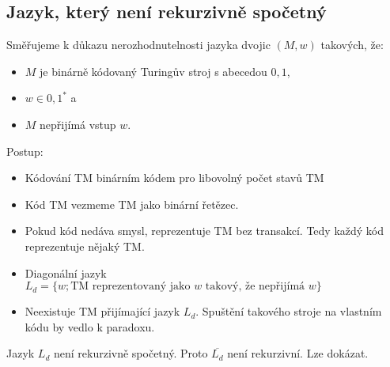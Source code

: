 \documentclass[../main.tex]{subfiles}
\begin{document}
\subsection{Jazyk, který není rekurzivně spočetný}
Směřujeme k důkazu nerozhodnutelnosti jazyka dvojic $(M,w)$ takových, že:
\begin{itemize}
    \item $M$ je binárně kódovaný Turingův stroj s abecedou ${0,1}$,
    \item $w \in {0,1}^*$ a
    \item $M$ nepřijímá vstup $w$.
\end{itemize}
Postup:
\begin{itemize}
    \item Kódování TM binárním kódem pro libovolný počet stavů TM
    \item Kód TM vezmeme TM jako binární řetězec.
    \item Pokud kód nedáva smysl, reprezentuje TM bez transakcí. Tedy každý kód reprezentuje nějaký TM.
    \item Diagonální jazyk $L_d = \{w; \text{TM reprezentovaný jako } w \text{ takový, že nepřijímá }w\}$
    \item Neexistuje TM přijímající jazyk $L_d$. Spuštění takového stroje na vlastním kódu by vedlo k paradoxu. 
\end{itemize}
Jazyk $L_d$ není rekurzivně spočetný. Proto $\overline{L_d}$ není rekurzivní. Lze dokázat.
\end{document}
